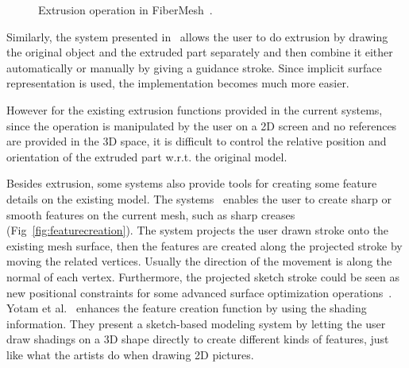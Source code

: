 \begin{figure} [htbp]
\renewcommand{\thesubfigure}{}
  \centering
  \caption{Extrusion operation in FiberMesh~\cite{NISA07}.}
  \label{fig:extrusion} %
\end{figure}

Similarly, the system presented in~\cite{KHR02} allows the user to do extrusion by drawing the original object and the extruded part separately and then combine it either automatically or manually by giving a guidance stroke. Since implicit surface representation is used, the implementation becomes much more easier.

However for the existing extrusion functions provided in the current systems, since the operation is manipulated by the user on a 2D screen and no references are provided in the 3D space, it is difficult to control the relative position and orientation of the extruded part w.r.t. the original model.

Besides extrusion, some systems also provide tools for creating some feature details on the existing model. The systems~\cite{NSAC05,OSSJ05,NISA07} enables the user to create sharp or smooth features on the current mesh, such as sharp creases (Fig~\ref{fig:featurecreation}). The system projects the user drawn stroke onto the existing mesh surface, then the features are created along the projected stroke by moving the related vertices. Usually the direction of the movement is along the normal of each vertex. Furthermore, the projected sketch stroke could be seen as new positional constraints for some advanced surface optimization operations~\cite{NISA07,EP09}. Yotam et al.~\cite{GZ08} enhances the feature creation function by using the shading information. They present a sketch-based modeling system by letting the user draw shadings on a 3D shape directly to create different kinds of features, just like what the artists do when drawing 2D pictures.

